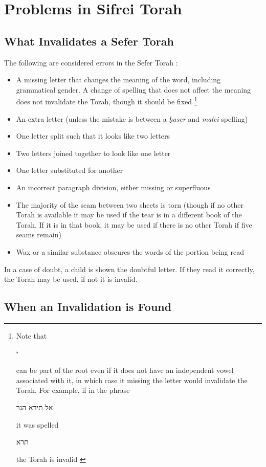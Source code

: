 \documentclass[11pt]{article}
\newcommand{\hebword}[1]{‎\begin{hebrew}\beginR #1 \endR\end{hebrew}}
\newcommand{\heth}{\d{h}}
\begin{document}
\section{Problems in Sifrei Torah}

\subsection{What Invalidates a Sefer Torah}

The following are considered errors in the Sefer Torah \parencite[24:1]{Kitzur}:
\begin{itemize}
	\item A missing letter that changes the meaning of the word, including grammatical gender. A change of spelling that does not affect the meaning does not invalidate the Torah, though it should be fixed \footnote{Note that\hebword{ י } can be part of the root even if it does not have an independent vowel associated with it, in which case it missing the letter would invalidate the Torah.  For example, if in the phrase \hebword{אל תירא הגר} it was spelled \hebword{תרא} the Torah is invalid \parencite*[24:1]{Kitzur}}
	\item An extra letter (unless the mistake is between a \textit{\heth aser} and \textit{malei} spelling)
	\item One letter split such that it looks like two letters
	\item Two letters joined together to look like one letter
	\item One letter substituted for another
	\item An incorrect paragraph division, either missing or superfluous
	\item The majority of the seam between two sheets is torn (though if no other Torah is available it may be used if the tear is in a different book of the Torah.  If it is in that book, it may be used if there is no other Torah if five seams remain)
	\item Wax or a similar substance obscures the words of the portion being read
\end{itemize}

In a case of doubt, a child is shown the doubtful letter.  If they read it correctly, the Torah may be used, if not it is invalid.

\subsection{When an Invalidation is Found}
\end{document}
